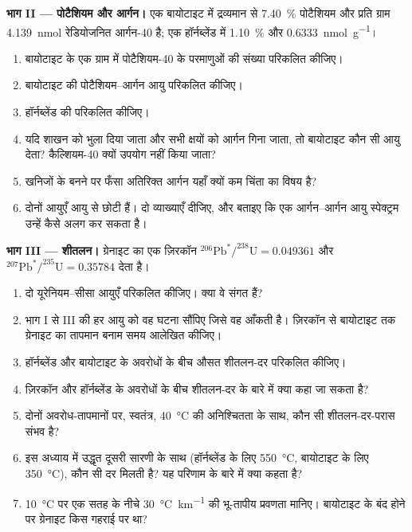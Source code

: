 \begin{problem}
\noindent\textbf{भाग II --- पोटैशियम और आर्गन।} एक बायोटाइट में द्रव्यमान से \qty{7.40}{\percent} पोटैशियम और प्रति ग्राम \qty{4.139}{nmol} रेडियोजनित आर्गन-40 है; एक हॉर्नब्लेंड में \qty{1.10}{\percent} और \qty{0.6333}{nmol.g^{-1}}।
\begin{enumerate}[resume]
  \item बायोटाइट के एक ग्राम में पोटैशियम-40 के परमाणुओं की संख्या परिकलित कीजिए।
  \item बायोटाइट की पोटैशियम–आर्गन आयु परिकलित कीजिए।
  \item हॉर्नब्लेंड की परिकलित कीजिए।
  \item यदि शाखन को भुला दिया जाता और सभी क्षयों को आर्गन गिना जाता, तो बायोटाइट कौन सी आयु देता? कैल्शियम-40 क्यों उपयोग नहीं किया जाता?
  \item खनिजों के बनने पर फँसा अतिरिक्त आर्गन यहाँ क्यों कम चिंता का विषय है?
  \item दोनों आयुएँ  आयु से छोटी हैं। दो व्याख्याएँ दीजिए, और बताइए कि एक आर्गन–आर्गन आयु स्पेक्ट्रम उन्हें कैसे अलग कर सकता है।
\end{enumerate}

\noindent\textbf{भाग III --- शीतलन।} ग्रेनाइट का एक ज़िरकॉन $^{206}\mathrm{Pb}^*/^{238}\mathrm{U} = 0.049361$ और $^{207}\mathrm{Pb}^*/^{235}\mathrm{U} = 0.35784$ देता है।
\begin{enumerate}[resume]
  \item दो यूरेनियम–सीसा आयुएँ परिकलित कीजिए। क्या वे संगत हैं?
  \item भाग I से III की हर आयु को वह घटना सौंपिए जिसे वह आँकती है। ज़िरकॉन से बायोटाइट तक ग्रेनाइट का तापमान बनाम समय आलेखित कीजिए।
  \item हॉर्नब्लेंड और बायोटाइट के अवरोधों के बीच औसत शीतलन-दर परिकलित कीजिए।
  \item ज़िरकॉन और हॉर्नब्लेंड के अवरोधों के बीच शीतलन-दर के बारे में क्या कहा जा सकता है?
  \item दोनों अवरोध-तापमानों पर, स्वतंत्र, \qty{40}{\celsius} की अनिश्चितता के साथ, कौन सी शीतलन-दर-परास संभव है?
  \item इस अध्याय में उद्धृत दूसरी सारणी के साथ (हॉर्नब्लेंड के लिए \qty{550}{\celsius}, बायोटाइट के लिए \qty{350}{\celsius}), कौन सी दर मिलती है? यह परिणाम के बारे में क्या कहता है?
  \item \qty{10}{\celsius} पर एक सतह के नीचे \qty{30}{\celsius.km^{-1}} की भू-तापीय प्रवणता मानिए। बायोटाइट के बंद होने पर ग्रेनाइट किस गहराई पर था?
\end{enumerate}


\end{problem}
